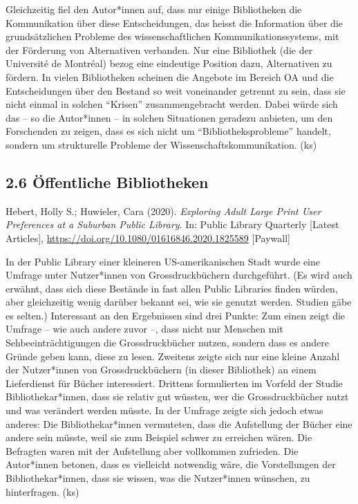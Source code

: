 \documentclass[a4paper,
fontsize=11pt,
oneside,
numbers=noperiodatend,
parskip=half-,
bibliography=totoc,
final
]{scrartcl}
\begin{document}
Gleichzeitig fiel den Autor*innen auf, dass nur einige Bibliotheken die
Kommunikation über diese Entscheidungen, das heisst die Information über
die grundsätzlichen Probleme des wissenschaftlichen
Kommunikationssystems, mit der Förderung von Alternativen verbanden. Nur
eine Bibliothek (die der Université de Montréal) bezog eine eindeutige
Position dazu, Alternativen zu fördern. In vielen Bibliotheken scheinen
die Angebote im Bereich OA und die Entscheidungen über den Bestand so
weit voneinander getrennt zu sein, dass sie nicht einmal in solchen
\enquote{Krisen} zusammengebracht werden. Dabei würde sich das -- so die
Autor*innen -- in solchen Situationen geradezu anbieten, um den
Forschenden zu zeigen, dass es sich nicht um
\enquote{Bibliotheksprobleme} handelt, sondern um strukturelle Probleme
der Wissenschaftskommunikation. (ks)

\hypertarget{uxf6ffentliche-bibliotheken}{%
\subsection{2.6 Öffentliche
Bibliotheken}\label{uxf6ffentliche-bibliotheken}}

Hebert, Holly S.; Huwieler, Cara (2020). \emph{Exploring Adult Large
Print User Preferences at a Suburban Public Library}. In: Public Library
Quarterly {[}Latest Articles{]},
\url{https://doi.org/10.1080/01616846.2020.1825589} {[}Paywall{]}

In der Public Library einer kleineren US-amerikanischen Stadt wurde eine
Umfrage unter Nutzer*innen von Grossdruckbüchern durchgeführt. (Es wird
auch erwähnt, dass sich diese Bestände in fast allen Public Libraries
finden würden, aber gleichzeitig wenig darüber bekannt sei, wie sie
genutzt werden. Studien gäbe es selten.) Interessant an den Ergebnissen
sind drei Punkte: Zum einen zeigt die Umfrage -- wie auch andere zuvor
--, dass nicht nur Menschen mit Sehbeeinträchtigungen die
Grossdruckbücher nutzen, sondern dass es andere Gründe geben kann, diese
zu lesen. Zweitens zeigte sich nur eine kleine Anzahl der Nutzer*innen
von Grossdruckbüchern (in dieser Bibliothek) an einem Lieferdienst für
Bücher interessiert. Drittens formulierten im Vorfeld der Studie
Bibliothekar*innen, dass sie relativ gut wüssten, wer die
Grossdruckbücher nutzt und was verändert werden müsste. In der Umfrage
zeigte sich jedoch etwas anderes: Die Bibliothekar*innen vermuteten,
dass die Aufstellung der Bücher eine andere sein müsste, weil sie zum
Beispiel schwer zu erreichen wären. Die Befragten waren mit der
Aufstellung aber vollkommen zufrieden. Die Autor*innen betonen, dass es
vielleicht notwendig wäre, die Vorstellungen der Bibliothekar*innen,
dass sie wissen, was die Nutzer*innen wünschen, zu hinterfragen. (ks)
\end{document}
